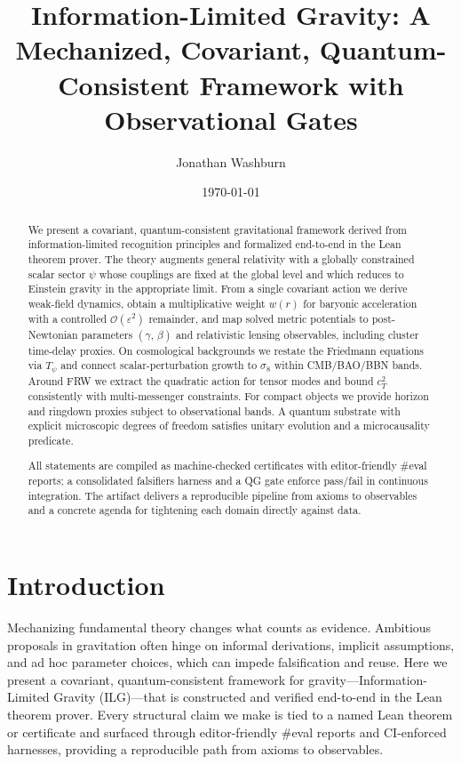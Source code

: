\documentclass[aps,prd,twocolumn,superscriptaddress,nofootinbib,floatfix,longbibliography]{revtex4-2}
\newcommand{\Order}{\mathcal{O}}
\begin{document}
\title{Information-Limited Gravity: A Mechanized, Covariant, Quantum-Consistent Framework with Observational Gates}

\author{Jonathan Washburn}


\date{\today}

\begin{abstract}
We present a covariant, quantum-consistent gravitational framework derived from information-limited recognition principles and formalized end-to-end in the Lean theorem prover. The theory augments general relativity with a globally constrained scalar sector $\psi$ whose couplings are fixed at the global level and which reduces to Einstein gravity in the appropriate limit. From a single covariant action we derive weak-field dynamics, obtain a multiplicative weight $w(r)$ for baryonic acceleration with a controlled $\Order(\varepsilon^2)$ remainder, and map solved metric potentials to post-Newtonian parameters $(\gamma,\,\beta)$ and relativistic lensing observables, including cluster time-delay proxies. On cosmological backgrounds we restate the Friedmann equations via $T_\psi$ and connect scalar-perturbation growth to $\sigma_8$ within CMB/BAO/BBN bands. Around FRW we extract the quadratic action for tensor modes and bound $c_T^2$ consistently with multi-messenger constraints. For compact objects we provide horizon and ringdown proxies subject to observational bands. A quantum substrate with explicit microscopic degrees of freedom satisfies unitary evolution and a microcausality predicate.

All statements are compiled as machine-checked certificates with editor-friendly \#eval reports; a consolidated falsifiers harness and a QG gate enforce pass/fail in continuous integration. The artifact delivers a reproducible pipeline from axioms to observables and a concrete agenda for tightening each domain directly against data.
\end{abstract}

\maketitle


\section{Introduction}\label{sec:intro}
%
Mechanizing fundamental theory changes what counts as evidence. Ambitious proposals in gravitation often hinge on informal derivations, implicit assumptions, and ad hoc parameter choices, which can impede falsification and reuse. Here we present a covariant, quantum-consistent framework for gravity---Information-Limited Gravity (ILG)---that is constructed and verified end-to-end in the Lean theorem prover. Every structural claim we make is tied to a named Lean theorem or certificate and surfaced through editor-friendly \#eval reports and CI-enforced harnesses, providing a reproducible path from axioms to observables.
%
\end{document}
